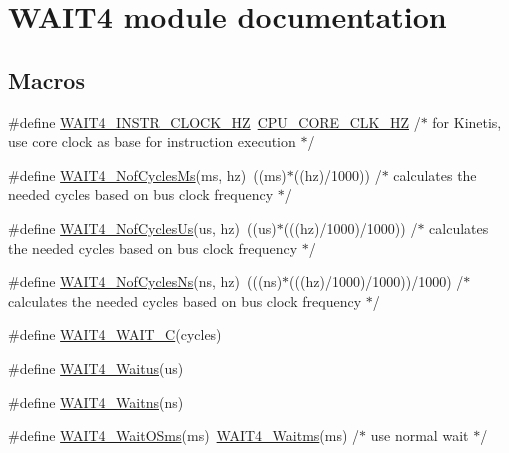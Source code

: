 \hypertarget{group___w_a_i_t4__module}{}\section{W\+A\+I\+T4 module documentation}
\label{group___w_a_i_t4__module}
\subsection*{Macros}
\begin{DoxyCompactItemize}
\item 
\#define \hyperlink{group___w_a_i_t4__module_ga79cc0104fa58e3905dda648c3be49cea}{W\+A\+I\+T4\+\_\+\+I\+N\+S\+T\+R\+\_\+\+C\+L\+O\+C\+K\+\_\+\+HZ}~\hyperlink{group___cpu__module_ga9dee0abd722c849e54c662ab11a1d2cf}{C\+P\+U\+\_\+\+C\+O\+R\+E\+\_\+\+C\+L\+K\+\_\+\+HZ} /$\ast$ for Kinetis, use core clock as base for instruction execution $\ast$/
\item 
\#define \hyperlink{group___w_a_i_t4__module_gad3a2ef0baed120ae0b28e75c71450967}{W\+A\+I\+T4\+\_\+\+Nof\+Cycles\+Ms}(ms,  hz)~((ms)$\ast$((hz)/1000)) /$\ast$ calculates the needed cycles based on bus clock frequency $\ast$/
\item 
\#define \hyperlink{group___w_a_i_t4__module_ga1301be60637fa5a05e0a9635ce6c1f5a}{W\+A\+I\+T4\+\_\+\+Nof\+Cycles\+Us}(us,  hz)~((us)$\ast$(((hz)/1000)/1000)) /$\ast$ calculates the needed cycles based on bus clock frequency $\ast$/
\item 
\#define \hyperlink{group___w_a_i_t4__module_ga2cce45996fd32a7ebfd37feb5c2e7a43}{W\+A\+I\+T4\+\_\+\+Nof\+Cycles\+Ns}(ns,  hz)~(((ns)$\ast$(((hz)/1000)/1000))/1000) /$\ast$ calculates the needed cycles based on bus clock frequency $\ast$/
\item 
\#define \hyperlink{group___w_a_i_t4__module_ga7d49e072b80ed80d586accaac3d0bfec}{W\+A\+I\+T4\+\_\+\+W\+A\+I\+T\+\_\+C}(cycles)
\item 
\#define \hyperlink{group___w_a_i_t4__module_gaa850ebbcb5371047081f0082cef8cab8}{W\+A\+I\+T4\+\_\+\+Waitus}(us)
\item 
\#define \hyperlink{group___w_a_i_t4__module_ga763b4cd67b459be091db13651686bd19}{W\+A\+I\+T4\+\_\+\+Waitns}(ns)
\item 
\#define \hyperlink{group___w_a_i_t4__module_ga4f1d9d66284a44cdca2733e4b2960239}{W\+A\+I\+T4\+\_\+\+Wait\+O\+Sms}(ms)~\hyperlink{group___w_a_i_t4__module_ga7a6804df6ef7344cfbea6873e0b574aa}{W\+A\+I\+T4\+\_\+\+Waitms}(ms) /$\ast$ use normal wait $\ast$/
\end{DoxyCompactItemize}
